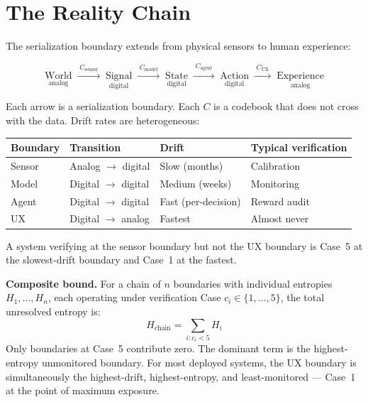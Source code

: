\documentclass[11pt,a4paper]{article}
\begin{document}
\section{The Reality Chain}
\label{sec:reality-chain}

The serialization boundary extends from physical sensors to human 
experience:

\[
\underset{\text{analog}}{\text{World}}
\;\xrightarrow{\;C_{\text{sensor}}\;}
\;\underset{\text{digital}}{\text{Signal}}
\;\xrightarrow{\;C_{\text{model}}\;}
\;\underset{\text{digital}}{\text{State}}
\;\xrightarrow{\;C_{\text{agent}}\;}
\;\underset{\text{digital}}{\text{Action}}
\;\xrightarrow{\;C_{\text{UX}}\;}
\;\underset{\text{analog}}{\text{Experience}}
\]

Each arrow is a serialization boundary. Each $C$ is a codebook that 
does not cross with the data. Drift rates are heterogeneous:

\begin{center}\small
\begin{tabular}{@{}llll@{}}
\toprule
\textbf{Boundary} & \textbf{Transition} & \textbf{Drift} 
& \textbf{Typical verification} \\
\midrule
Sensor & Analog $\to$ digital & Slow (months) & Calibration \\
Model  & Digital $\to$ digital & Medium (weeks) & Monitoring \\
Agent  & Digital $\to$ digital & Fast (per-decision) & Reward audit \\
UX     & Digital $\to$ analog & Fastest & Almost never \\
\bottomrule
\end{tabular}
\end{center}

A system verifying at the sensor boundary but not the UX boundary 
is Case~5 at the slowest-drift boundary and Case~1 at the fastest.

\textbf{Composite bound.} For a chain of $n$ boundaries with 
individual entropies $H_1, \ldots, H_n$, each operating under 
verification Case $c_i \in \{1, \ldots, 5\}$, the total unresolved 
entropy is:
\[
H_{\text{chain}} = \sum_{i : c_i < 5} H_i
\]
Only boundaries at Case~5 contribute zero. The dominant term is the 
highest-entropy unmonitored boundary. For most deployed systems, the 
UX boundary is simultaneously the highest-drift, highest-entropy, 
and least-monitored --- Case~1 at the point of maximum exposure.
\end{document}
